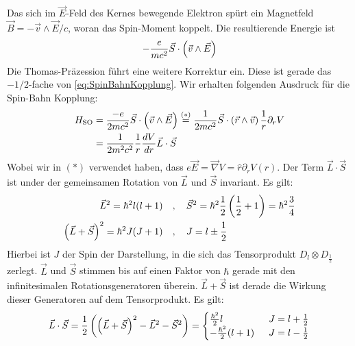 Das sich im $\vec{E}$-Feld des Kernes bewegende Elektron spürt ein Magnetfeld
$\vec{B} = - \vec{v} \wedge \vec{E} /c$, woran das Spin-Moment koppelt. Die
resultierende Energie ist
\begin{align}\label{eq:SpinBahnKopplung}
    - \frac{e}{m c^2} \vec{S} \cdot \left( \vec{v} \wedge \vec{E} \right)
\end{align}
Die Thomas-Präzession führt eine weitere Korrektur ein. Diese ist gerade
das $-1/2$-fache von \cref{eq:SpinBahnKopplung}. Wir erhalten folgenden
Ausdruck für die Spin-Bahn Kopplung:
\begin{align*}
    H_{\text{SO}} &=
    \frac{-e}{2mc^2} \vec{S} \cdot \left( \vec{v} \wedge \vec{E} \right)
    \stackrel{(\ast)}{=}
    \frac{1}{2mc^2} \vec{S} \cdot \left( \vec{r} \wedge \vec{v} \right) \frac{1}{r} \partial_r V
    \\
    &= \frac{1}{2 m^2 c^2} \frac{1}{r} \frac{dV}{dr} \vec{L} \cdot \vec{S}
\end{align*}
Wobei wir in $(\ast)$ verwendet haben, dass $e \vec{E} = \vec{\nabla} V
= \hat{r} \partial_r V(r)$. Der Term $\vec{L} \cdot \vec{S}$ ist under der
gemeinsamen Rotation von $\vec{L}$ und $\vec{S}$ invariant. Es gilt:
\begin{align*}
    \vec{L}^2 = \hbar^2 l(l+1)
    \hspace{10pt} &, \hspace{10pt}
    \vec{S}^2 = \hbar^2 \frac{1}{2} \left( \frac{1}{2} + 1 \right) = \hbar^2 \frac{3}{4}
    \\
    \left( \vec{L} + \vec{S} \right)^2 = \hbar^2 J (J+1)
    \hspace{10pt} &, \hspace{10pt} J = l \pm \frac{1}{2}
\end{align*}
Hierbei ist $J$ der Spin der Darstellung, in die sich das Tensorprodukt $D_l \otimes
D_{\frac{1}{2}}$ zerlegt. $\vec{L}$ und $\vec{S}$ stimmen bis auf einen Faktor von
$\hbar$ gerade mit den infinitesimalen Rotationsgeneratoren überein. $\vec{L} +
\vec{S}$ ist derade die Wirkung dieser Generatoren auf dem Tensorprodukt. Es gilt:
\begin{align*}
    \vec{L} \cdot \vec{S} = \frac{1}{2} \left( \left( \vec{L} + \vec{S} \right)^2 - \vec{L}^2 - \vec{S}^2 \right)
    = \begin{cases}
        \frac{\hbar^2}{2} l \hspace{5pt} &J=l+\frac{1}{2}
        \\
        - \frac{\hbar^2}{2} (l+1) \hspace{5pt} &J=l-\frac{1}{2}
    \end{cases}
\end{align*}
